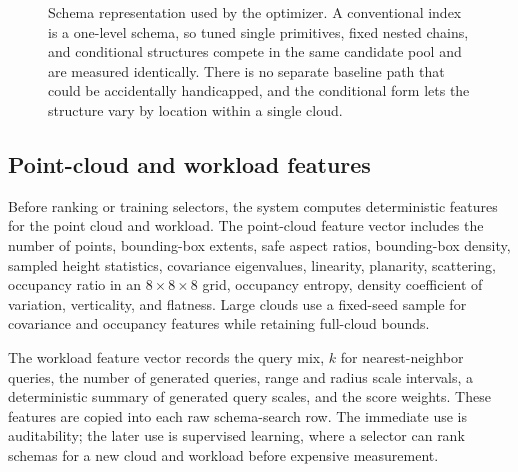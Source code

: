\begin{figure}[t]
  \caption{Schema representation used by the optimizer. A conventional index is a one-level schema, so tuned single primitives, fixed nested chains, and conditional structures compete in the same candidate pool and are measured identically. There is no separate baseline path that could be accidentally handicapped, and the conditional form lets the structure vary by location within a single cloud.}
  \label{fig:schema-representation}
\end{figure}

\subsection{Point-cloud and workload features}

Before ranking or training selectors, the system computes deterministic features for the point cloud and workload. The point-cloud feature vector includes the number of points, bounding-box extents, safe aspect ratios, bounding-box density, sampled height statistics, covariance eigenvalues, linearity, planarity, scattering, occupancy ratio in an $8\times8\times8$ grid, occupancy entropy, density coefficient of variation, verticality, and flatness. Large clouds use a fixed-seed sample for covariance and occupancy features while retaining full-cloud bounds.

The workload feature vector records the query mix, $k$ for nearest-neighbor queries, the number of generated queries, range and radius scale intervals, a deterministic summary of generated query scales, and the score weights. These features are copied into each raw schema-search row. The immediate use is auditability; the later use is supervised learning, where a selector can rank schemas for a new cloud and workload before expensive measurement.

